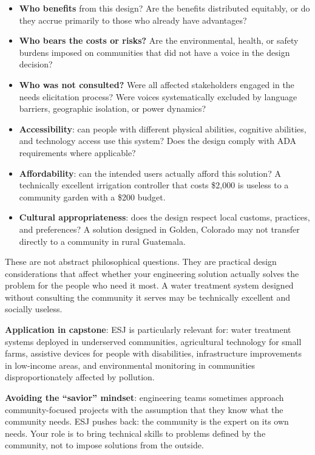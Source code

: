 \begin{itemize}[nosep,leftmargin=1.5em]
\item \textbf{Who benefits} from this design? Are the benefits distributed equitably, or do they accrue primarily to those who already have advantages?
\item \textbf{Who bears the costs or risks?} Are the environmental, health, or safety burdens imposed on communities that did not have a voice in the design decision?
\item \textbf{Who was not consulted?} Were all affected stakeholders engaged in the needs elicitation process? Were voices systematically excluded by language barriers, geographic isolation, or power dynamics?
\item \textbf{Accessibility}: can people with different physical abilities, cognitive abilities, and technology access use this system? Does the design comply with ADA requirements where applicable?
\item \textbf{Affordability}: can the intended users actually afford this solution? A technically excellent irrigation controller that costs \$2,000 is useless to a community garden with a \$200 budget.
\item \textbf{Cultural appropriateness}: does the design respect local customs, practices, and preferences? A solution designed in Golden, Colorado may not transfer directly to a community in rural Guatemala.
\end{itemize}

These are not abstract philosophical questions. They are practical design considerations that affect whether your engineering solution actually solves the problem for the people who need it most. A water treatment system designed without consulting the community it serves may be technically excellent and socially useless.

\textbf{Application in capstone}: ESJ is particularly relevant for: water treatment systems deployed in underserved communities, agricultural technology for small farms, assistive devices for people with disabilities, infrastructure improvements in low-income areas, and environmental monitoring in communities disproportionately affected by pollution.

\textbf{Avoiding the ``savior'' mindset}: engineering teams sometimes approach community-focused projects with the assumption that they know what the community needs. ESJ pushes back: the community is the expert on its own needs. Your role is to bring technical skills to problems defined by the community, not to impose solutions from the outside.

